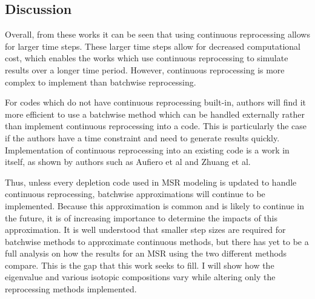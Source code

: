 \subsection{Discussion}
\label{litrev-msr-gaps}

Overall, from these works it can be seen that using continuous reprocessing allows for larger time steps.
These larger time steps allow for decreased computational cost, which enables the works which use continuous reprocessing to simulate results over a longer time period.
However, continuous reprocessing is more complex to implement than batchwise reprocessing.

For codes which do not have continuous reprocessing built-in, authors will find it more efficient to use a batchwise method which can be handled externally rather than implement continuous reprocessing into a code.
This is particularly the case if the authors have a time constraint and need to generate results quickly.
Implementation of continuous reprocessing into an existing code is a work in itself, as shown by authors such as Aufiero et al and Zhuang et al.

Thus, unless every depletion code used in MSR modeling is updated to handle continuous reprocessing, batchwise approximations will continue to be implemented.
Because this approximation is common and is likely to continue in the future, it is of increasing importance to determine the impacts of this approximation.
It is well understood that smaller step sizes are required for batchwise methods to approximate continuous methods, but there has yet to be a full analysis on how the results for an MSR using the two different methods compare.
This is the gap that this work seeks to fill.
I will show how the eigenvalue and various isotopic compositions vary while altering only the reprocessing methods implemented.

